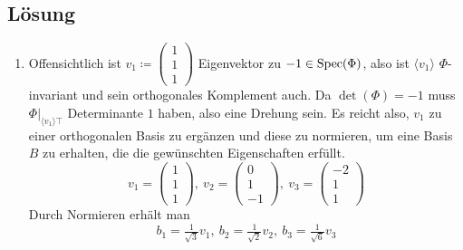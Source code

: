 \subsection{Lösung}
\begin{enumerate}
	\item Offensichtlich ist \( v_1 \coloneqq \left( \begin{smallmatrix}
		1 \\ 1 \\ 1
	\end{smallmatrix} \right) \) Eigenvektor zu \( -1 \in \text{Spec}(\Phi) \), also ist \( \langle v_1 \rangle \) \( \Phi \)-invariant und sein orthogonales Komplement auch. Da \( \det(\Phi)=-1 \) muss \( \Phi|_{\langle v_1 \rangle\top} \) Determinante \( 1 \) haben, also eine Drehung sein. Es reicht also, \( v_1 \) zu einer orthogonalen Basis zu ergänzen und diese zu normieren, um eine Basis \( B \) zu erhalten, die die gewünschten Eigenschaften erfüllt.
	\begin{equation*}
		v_1 = \left( \begin{smallmatrix}
			1 \\ 1 \\ 1
		\end{smallmatrix} \right), \ v_2 = \left( \begin{smallmatrix}
			0 \\ 1 \\ -1
		\end{smallmatrix} \right), \ v_3 = \left( \begin{smallmatrix}
			-2 \\ 1 \\ 1
		\end{smallmatrix} \right)
	\end{equation*}
	Durch Normieren erhält man
	\begin{equation*}
		b_1 = \tfrac{1}{\sqrt{3}}v_1, \ b_2 = \tfrac{1}{\sqrt{2}}v_2, \ b_3= \tfrac{1}{\sqrt{6}}v_3
	\end{equation*}


\end{enumerate}
